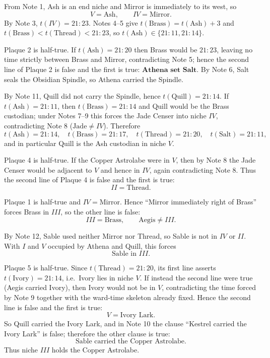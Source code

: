 \endgroup




\SolutionPage

\scriptsize

From Note 1, Ash is an end niche and Mirror is immediately to its west, so
\[
V=\text{Ash},\qquad IV=\text{Mirror}.
\]
By Note 3, \(t(IV)=21{:}23\). Notes 4--5 give \(t(\text{Brass})=t(\text{Ash})+3\) and \(t(\text{Brass})<t(\text{Thread})<21{:}23\), so \(t(\text{Ash})\in\{21{:}11,21{:}14\}\).

Plaque 2 is half-true. If \(t(\text{Ash})=21{:}20\) then Brass would be \(21{:}23\), leaving no time strictly between Brass and Mirror, contradicting Note 5; hence the second line of Plaque 2 is false and the first is true:
$
\textbf{Athena set Salt.}
$
By Note 6, Salt seals the Obsidian Spindle, so Athena carried the Spindle.

By Note 11, Quill did not carry the Spindle, hence \(t(\text{Quill})=21{:}14\). If \(t(\text{Ash})=21{:}11\), then \(t(\text{Brass})=21{:}14\) and Quill would be the Brass custodian; under Notes 7--9 this forces the Jade Censer into niche \(IV\), contradicting Note 8 (\(\text{Jade}\neq IV\)). Therefore
\[
t(\text{Ash})=21{:}14,\quad t(\text{Brass})=21{:}17,\quad t(\text{Thread})=21{:}20,\quad t(\text{Salt})=21{:}11,
\]
and in particular Quill is the Ash custodian in niche \(V\).

Plaque 4 is half-true. If the Copper Astrolabe were in \(V\), then by Note 8 the Jade Censer would be adjacent to \(V\) and hence in \(IV\), again contradicting Note 8. Thus the second line of Plaque 4 is false and the first is true:
\[
II=\text{Thread}.
\]

Plaque 1 is half-true and \(IV=\text{Mirror}\). Hence ``Mirror immediately right of Brass'' forces Brass in \(III\), so the other line is false:
\[
III=\text{Brass},\qquad \text{Aegis}\neq III.
\]

By Note 12, Sable used neither Mirror nor Thread, so Sable is not in \(IV\) or \(II\). With \(I\) and \(V\) occupied by Athena and Quill, this forces
\[
\text{Sable in }III.
\]

Plaque 5 is half-true. Since \(t(\text{Thread})=21{:}20\), its first line asserts \(t(\text{Ivory})=21{:}14\), i.e.\ Ivory lies in niche \(V\). If instead the second line were true (Aegis carried Ivory), then Ivory would not be in \(V\), contradicting the time forced by Note 9 together with the ward-time skeleton already fixed. Hence the second line is false and the first is true:
\[
V=\text{Ivory Lark}.
\]
So Quill carried the Ivory Lark, and in Note 10 the clause ``Kestrel carried the Ivory Lark'' is false; therefore the other clause is true:
\[
\text{Sable carried the Copper Astrolabe}.
\]
Thus niche \(III\) holds the Copper Astrolabe.

